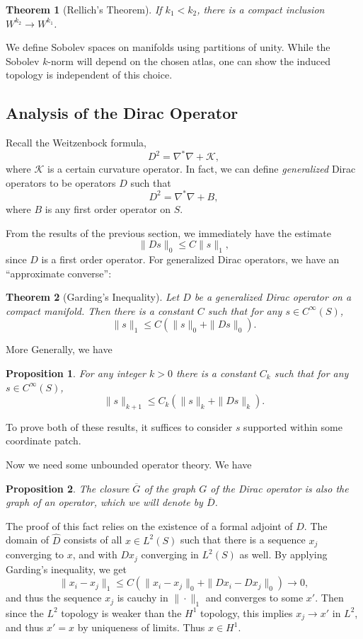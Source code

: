 \documentclass[12pt, reqno]{extarticle}
\theoremstyle{plain}
\newtheorem{theorem}{Theorem}[section]
\newtheorem{proposition}{Proposition}[section]
\theoremstyle{definition}
\theoremstyle{remark}
\begin{document}
\begin{theorem}[Rellich's Theorem]\label{rellich}
    If $k_1 < k_2$, there is a compact inclusion $W^{k_2} \to W^{k_1}$.
\end{theorem}

We define Sobolev spaces on manifolds using partitions of unity. While the Sobolev $k$-norm will
depend on the chosen atlas, one can show the induced topology is independent of this choice.

\subsection{Analysis of the Dirac Operator}

Recall the Weitzenbock formula,
\[
    D^2 = \nabla^*\nabla + \mathcal{K},
\]
where $\mathcal{K}$ is a certain curvature operator. In fact, we can define
\textit{generalized} Dirac operators to be operators $D$ such that
\[
    D^2 = \nabla^*\nabla + B,
\]
where $B$ is any first order operator on $S$. 

From the results of the previous section, we immediately have the estimate
\[
    \|Ds\|_0 \leq C\|s\|_1,
\]
since $D$ is a first order operator. For generalized Dirac operators, we have an 
``approximate converse'':

\begin{theorem}[Garding's Inequality]
    Let $D$ be a generalized Dirac operator on a compact manifold. Then there is a constant $C$
    such that for any $s \in C^\infty(S)$, 
    \[
        \|s\|_1 \leq C(\|s\|_0 + \|Ds\|_0).
    \]
\end{theorem}

More Generally, we have 
\begin{proposition}
    For any integer $k > 0$ there is a constant $C_k$ such that for any $s \in C^\infty(S)$,
    \[
        \|s\|_{k + 1} \leq C_k(\|s\|_k + \|Ds\|_k).
    \]
\end{proposition}

To prove both of these results, it suffices to consider $s$ supported within some coordinate patch.

Now we need some unbounded operator theory. We have 

\begin{proposition}
    The closure $\overline{G}$ of the graph $G$ of the Dirac operator is also the graph of an operator,
    which we will denote by $\overline{D}$.
\end{proposition}

The proof of this fact relies on the existence of a formal adjoint of $D$. The domain of $\widehat{D}$
consists of all $x \in L^2(S)$ such that there is a sequence $x_j$ converging to $x$, and with $Dx_j$ 
converging in $L^2(S)$ as well. By applying Garding's inequality, we get
\[
    \|x_i - x_j\|_1 \leq C(\|x_i - x_j\|_0 + \|Dx_i - Dx_j\|_0) \to 0,
\]
and thus the sequence $x_j$ is cauchy in $\|\cdot\|_1$ and converges to some $x'$. Then since the $L^2$
topology is weaker than the $H^1$ topology, this implies $x_j \to x'$ in $L^2$, and thus $x' = x$ by
uniqueness of limits. Thus $x \in H^1$. 
\end{document}
